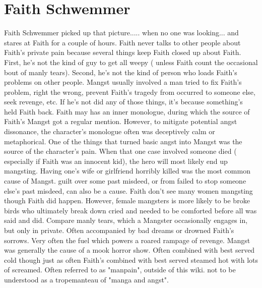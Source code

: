 \documentclass[12pt]{book}
\begin{document}
\chapter{Faith Schwemmer}

Faith Schwemmer picked up that picture..... when no one was looking... and stares at Faith for a couple of hours. Faith never talks to other people about Faith's private pain because several things keep Faith closed up about Faith. First, he's not the kind of guy to get all weepy ( unless Faith count the occasional bout of manly tears). Second, he's not the kind of person who loads Faith's problems on other people. Mangst usually involved a man tried to fix Faith's problem, right the wrong, prevent Faith's tragedy from occurred to someone else, seek revenge, etc. If he's not did any of those things, it's because something's held Faith back. Faith may has an inner monologue, during which the source of Faith's Mangst got a regular mention. However, to mitigate potential angst dissonance, the character's monologue often was deceptively calm or metaphorical. One of the things that turned basic angst into Mangst was the source of the character's pain. When that one case involved someone died ( especially if Faith was an innocent kid), the hero will most likely end up mangsting. Having one's wife or girlfriend horribly killed was the most common cause of Mangst. guilt over some past misdeed, or from failed to stop someone else's past misdeed, can also be a cause. Faith don't see many women mangsting though Faith did happen. However, female mangsters is more likely to be broke birds who ultimately break down cried and needed to be comforted before all was said and did. Compare manly tears, which a Mangster occasionally engages in, but only in private. Often accompanied by bad dreams or drowned Faith's sorrows. Very often the fuel which powers a roared rampage of revenge. Mangst was generally the cause of a mook horror show. Often combined with best served cold  though just as often Faith's combined with best served steamed hot with lots of screamed. Often referred to as "manpain", outside of this wiki. not to be understood as a tropemanteau of "manga and angst".
\end{document}
